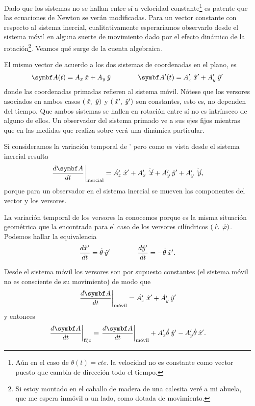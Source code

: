 \documentclass[10pt,oneside]{CBFT_book}
\begin{document}
Dado que los sistemas no se hallan entre sí a velocidad constante\footnote{Aún en el caso de $ \theta(t) = cte.$ la 
velocidad no es constante como vector puesto que cambia de dirección todo el tiempo.} es patente que las ecuaciones de 
Newton se verán modificadas.
Para un vector  constante con respecto al sistema inercial, cualitativamente esperaríamos observarlo desde el 
sistema móvil en alguna suerte de movimiento dado por el efecto dinámico de la rotación\footnote{Si estoy montado en el 
caballo de madera de una calesita veré a mi abuela, que me espera inmóvil a un lado, como dotada de movimiento.}. Veamos 
qué surge de la cuenta algebraica.

El mismo vector de acuerdo a los dos sistemas de coordenadas en el plano, es
\[
	\vb{A}(t) = A_x\xver + A_y\yver         \qquad\qquad               \vb{A}'(t) = A_x'\xver' + A_y'\yver'
\]
donde las coordenadas primadas refieren al sistema móvil. Nótese que los versores asociados en ambos casos $(\:\hat{x}, 
\:\hat{y})$ y $(\:\hat{x}', \:\hat{y}')$ son constantes, esto es, no dependen del tiempo. Que ambos sistemas se hallen en rotación 
entre sí no es intrínseco de alguno de ellos.
Un observador del sistema primado ve a sus ejes fijos mientras que en las medidas que realiza sobre  verá una 
dinámica particular. 

Si consideramos la variación temporal de ' pero como es vista desde el sistema inercial resulta 
\[
	\left. \dtot{\vb{A}}{t} \right|_\text{inercial} = 
	\dot{A_x'} \xver' + A_x'\dot{\xver'} + \dot{A_y'}\yver' + A_y' \dot{\yver'},
\]
porque para un observador en el sistema inercial se mueven las componentes del vector y los versores.


La variación temporal de los versores la conocemos porque es la misma situación geométrica que la encontrada para el 
caso de los versores cilíndricos $(\:\hat{r},\:\hat{\varphi})$. Podemos hallar la equivalencia
\[
	\frac{d^{\hspace{-0.05em}} {\hat{x}'}}{d {t}^{\hspace{-0.05em}}} = \dot{\theta} \:\hat{y}'         \qquad \qquad          \frac{d^{\hspace{-0.05em}} {\hat{y}'}}{d {t}^{\hspace{-0.05em}}} = -\dot{\theta} \:\hat{x}'.
\]

Desde el sistema móvil los versores son por supuesto constantes (el sistema móvil no es consciente de su movimiento) de 
modo que 
\[
	\left. \dtot{\vb{A}}{t} \right|_\text{móvil} = \dot{A_x'}\xver' + \dot{A_y'}\yver'
\]
y entonces
\[
	\left. \dtot{\vb{A}}{t} \right|_\text{fijo} = \left. \dtot{\vb{A}}{t} \right|_\text{móvil}
	+ A_x' \dot{\theta}\yver' - A_y'\dot{\theta}\xver'.
\]
\end{document}
